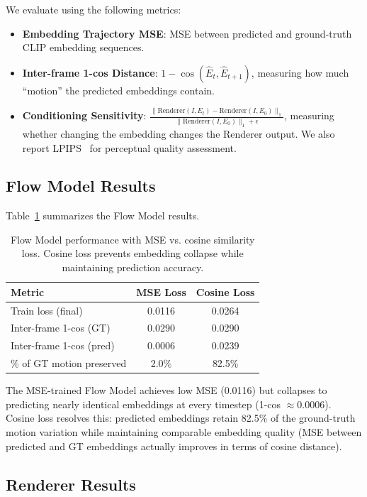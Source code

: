 \documentclass[10pt,twocolumn,letterpaper]{article}
\begin{document}
We evaluate using the following metrics:
\begin{itemize}
    \item \textbf{Embedding Trajectory MSE}: MSE between predicted and
    ground-truth CLIP embedding sequences.
    \item \textbf{Inter-frame 1-cos Distance}: $1 - \cos(\hat{E}_t, \hat{E}_{t+1})$,
    measuring how much ``motion'' the predicted embeddings contain.
    \item \textbf{Conditioning Sensitivity}: $\frac{\|\text{Renderer}(I, E_t) - \text{Renderer}(I, E_0)\|_1}{\|\text{Renderer}(I, E_0)\|_1 + \epsilon}$,
    measuring whether changing the embedding changes the Renderer output.
We also report LPIPS~\cite{zhang2018} for perceptual quality assessment.
\end{itemize}

\subsection{Flow Model Results}

Table~\ref{tab:flow} summarizes the Flow Model results.

\begin{table}[h]
\centering
\caption{Flow Model performance with MSE vs. cosine similarity loss.
Cosine loss prevents embedding collapse while maintaining prediction
accuracy.}
\label{tab:flow}
\begin{tabular}{lcc}
\toprule
\textbf{Metric} & \textbf{MSE Loss} & \textbf{Cosine Loss} \\
\midrule
Train loss (final)         & 0.0116  & 0.0264  \\
Inter-frame 1-cos (GT)     & 0.0290  & 0.0290  \\
Inter-frame 1-cos (pred)   & 0.0006  & 0.0239  \\
\% of GT motion preserved  & 2.0\%   & 82.5\%  \\
\bottomrule
\end{tabular}
\end{table}

The MSE-trained Flow Model achieves low MSE (0.0116) but collapses to
predicting nearly identical embeddings at every timestep (1-cos $\approx
0.0006$). Cosine loss resolves this: predicted embeddings retain 82.5\% of
the ground-truth motion variation while maintaining comparable embedding
quality (MSE between predicted and GT embeddings actually improves in terms
of cosine distance).

\subsection{Renderer Results}
\end{document}

